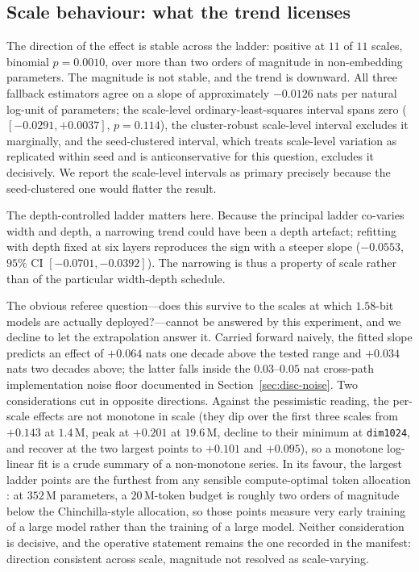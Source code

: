 \documentclass[final,5p,times,twocolumn]{elsarticle}
\theoremstyle{remark}
\begin{document}
\subsection{Scale behaviour: what the trend licenses}
\label{sec:disc-scale}

The direction of the effect is stable across the ladder: positive at $11$ of
$11$ scales, binomial $p = 0.0010$, over more than two orders of magnitude in
non-embedding parameters. The magnitude is not stable, and the trend is
downward. All three fallback estimators agree on a slope of approximately
$-0.0126$ nats per natural log-unit of parameters; the scale-level
ordinary-least-squares interval spans zero
($[-0.0291, +0.0037]$, $p = 0.114$), the cluster-robust scale-level interval
excludes it marginally, and the seed-clustered interval, which treats
scale-level variation as replicated within seed and is anticonservative for
this question, excludes it decisively. We report the scale-level intervals as
primary precisely because the seed-clustered one would flatter the result.

The depth-controlled ladder matters here. Because the principal ladder
co-varies width and depth, a narrowing trend could have been a depth artefact;
refitting with depth fixed at six layers reproduces the sign with a steeper
slope ($-0.0553$, $95\%$ CI $[-0.0701, -0.0392]$). The narrowing is thus a
property of scale rather than of the particular width-depth schedule.

The obvious referee question---does this survive to the scales at which
$1.58$-bit models are actually deployed?---cannot be answered by this
experiment, and we decline to let the extrapolation answer it. Carried forward
naively, the fitted slope predicts an effect of $+0.064$ nats one decade above
the tested range and $+0.034$ nats two decades above; the latter falls inside
the $0.03$--$0.05$ nat cross-path implementation noise floor documented in
Section~\ref{sec:disc-noise}. Two
considerations cut in opposite directions. Against the pessimistic reading, the
per-scale effects are not monotone in scale (they dip over the first three
scales from $+0.143$ at $1.4$\,M, peak at $+0.201$ at $19.6$\,M, decline to
their minimum at \texttt{dim1024}, and recover at the two largest points to
$+0.101$ and $+0.095$), so a monotone
log-linear fit is a crude summary of a non-monotone series. In its favour, the
largest ladder points are the furthest from any sensible compute-optimal
token allocation \cite{kaplan2020,hoffmann2022}: at
$352$\,M parameters, a $20$\,M-token budget is roughly two orders of magnitude
below the Chinchilla-style allocation, so those points measure very early
training of a large model rather than the training of a large model. Neither
consideration is decisive, and the operative statement remains the one recorded
in the manifest: direction consistent across scale, magnitude not resolved as
scale-varying.
\end{document}
